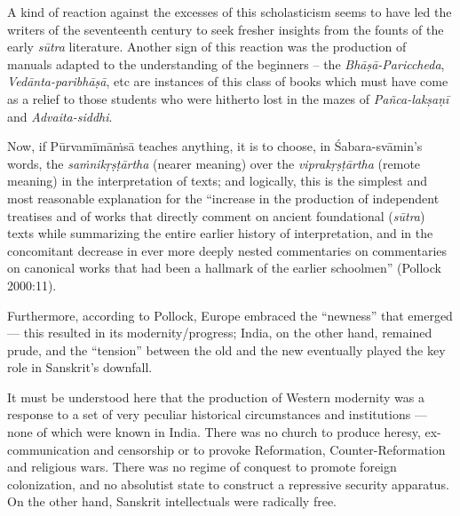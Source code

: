 A kind of reaction against the excesses of this scholasticism seems to have led the writers of the seventeenth century to seek fresher insights from the founts of the early {\sl sūtra} literature. Another sign of this reaction was the production of manuals adapted to the understanding of the beginners – the {\sl Bhāṣā-Pariccheda}, {\sl Vedānta-paribhāṣā}, etc are instances of this class of books which must have come as a relief to those students who were hitherto lost in the mazes of {\sl Pañca-lakṣaṇī} and {\sl Advaita-siddhi}. 

Now, if Pūrvamīmāṁsā teaches anything, it is to choose, in Śabara-svāmin’s words, the {\sl saṁnikṛṣṭārtha} (nearer meaning) over the {\sl viprakṛṣṭārtha} (remote meaning) in the interpretation of texts; and logically, this is the simplest and most reasonable explanation for the “increase in the production of independent treatises and of works that directly comment on ancient foundational ({\sl sūtra}) texts while summarizing the entire earlier history of interpretation, and in the concomitant decrease in ever more deeply nested commentaries on commentaries on canonical works that had been a hallmark of the earlier schoolmen” (Pollock 2000:11).

Furthermore, according to Pollock, Europe embraced the “newness” that emerged— this resulted in its modernity/progress; India, on the other hand, remained prude, and the “tension” between the old and the new eventually played the key role in Sanskrit’s downfall.

It must be understood here that the production of Western modernity was a response to a set of very peculiar historical circumstances and institutions — none of which were known in India. There was no church to produce heresy, ex-communication and censorship or to provoke Reformation, Counter-Reformation and religious wars. There was no regime of conquest to promote foreign colonization, and no absolutist state to construct a repressive security apparatus. On the other hand, Sanskrit intellectuals were {\rm radically free}. 

